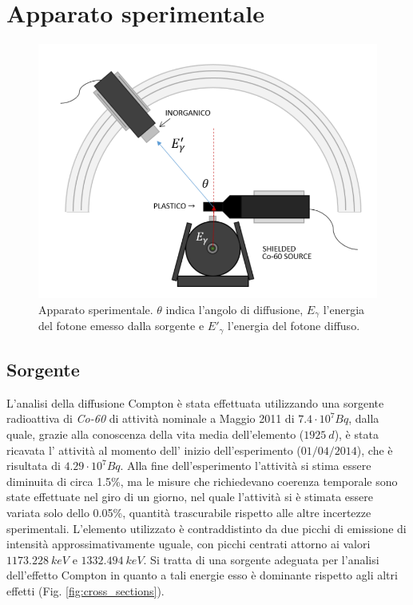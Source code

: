 \documentclass[8pt]{extarticle}
\begin{document}
\section{Apparato sperimentale} \label{sec:apparato}
\begin{figure}
\begin{center}
\includegraphics[scale=0.5]{Apparato2}
\caption{Apparato sperimentale. $\theta$ indica l'angolo di diffusione, $E_\gamma$ l'energia del fotone emesso dalla sorgente e $E'_\gamma$ l'energia del fotone diffuso.}
\label{fig:apparato}
\end{center}
\end{figure}



\subsection{Sorgente}
L'analisi della diffusione Compton è stata effettuata utilizzando una sorgente radioattiva di \textit{Co-60} di attività nominale a Maggio 2011 di $7.4 \cdot 10^7 Bq$, dalla quale, grazie alla conoscenza della vita media dell'elemento ($1925 \ d$), è stata ricavata l' attività al momento dell' inizio dell'esperimento ($01/04/2014$), che è risultata di $4.29 \cdot 10^7 Bq$. Alla fine dell'esperimento l'attività si stima essere diminuita di circa 1.5\%, ma le misure che richiedevano coerenza temporale sono state effettuate nel giro di un giorno, nel quale l'attività si è stimata essere variata solo dello 0.05\%, quantità trascurabile rispetto alle altre incertezze sperimentali.
L'elemento utilizzato è contraddistinto da due picchi di emissione di intensità approssimativamente uguale, con picchi centrati attorno ai valori $1173.228 \ keV$ e $1332.494 \ keV$. 
Si tratta di una sorgente adeguata per l'analisi dell'effetto Compton in quanto a tali energie esso è dominante rispetto agli altri effetti (Fig. \ref{fig:cross_sections}).
\end{document}
